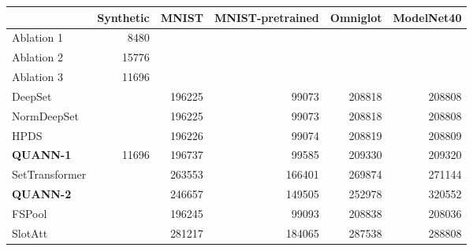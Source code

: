 \begin{tabular}{lrrrrr}
\toprule
 & Synthetic & MNIST & MNIST-pretrained & Omniglot & ModelNet40 \\
\midrule
Ablation 1 & 8480 &  &  &  &  \\
Ablation 2 & 15776 &  &  &  &  \\
Ablation 3 & 11696 &  &  &  &  \\
DeepSet &  & 196225 & 99073 & 208818 & 208808 \\
NormDeepSet &  & 196225 & 99073 & 208818 & 208808 \\
HPDS &  & 196226 & 99074 & 208819 & 208809 \\
\textbf{QUANN-1} & 11696 & 196737 & 99585 & 209330 & 209320 \\
SetTransformer &  & 263553 & 166401 & 269874 & 271144 \\
\textbf{QUANN-2} &  & 246657 & 149505 & 252978 & 320552 \\
FSPool &  & 196245 & 99093 & 208838 & 208036 \\
SlotAtt &  & 281217 & 184065 & 287538 & 288808 \\
\bottomrule
\end{tabular}
